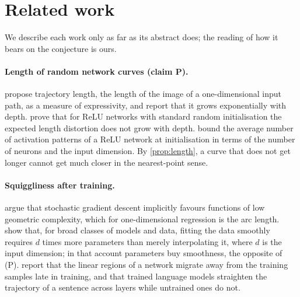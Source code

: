 \section{Related work}
\label{sec:related}

We describe each work only as far as its abstract does; the reading of how it
bears on the conjecture is ours.

\paragraph{Length of random network curves (claim P).}
\citet{raghu2017expressive} propose trajectory length, the length of the image
of a one-dimensional input path, as a measure of expressivity, and report that
it grows exponentially with depth. \citet{hanin2022preserve} prove that for ReLU
networks with standard random initialisation the expected length distortion does
not grow with depth. \citet{hanin2019few} bound the average number of activation
patterns of a ReLU network at initialisation in terms of the number of neurons
and the input dimension. By \cref{prop:length}, a curve that does not get longer
cannot get much closer in the nearest-point sense.

\paragraph{Squiggliness after training.}
\citet{dherin2021geometric} argue that stochastic gradient descent implicitly
favours functions of low geometric complexity, which for one-dimensional
regression is the arc length. \citet{bubeck2021universal} show that, for broad
classes of models and data, fitting the data smoothly requires $d$ times more
parameters than merely interpolating it, where $d$ is the input dimension; in
that account parameters buy smoothness, the opposite of (P).
\citet{humayun2024grok} report that the linear regions of a network migrate
away from the training samples late in training, and
\citet{hosseini2023straighten} that trained language models straighten the
trajectory of a sentence across layers while untrained ones do not.

